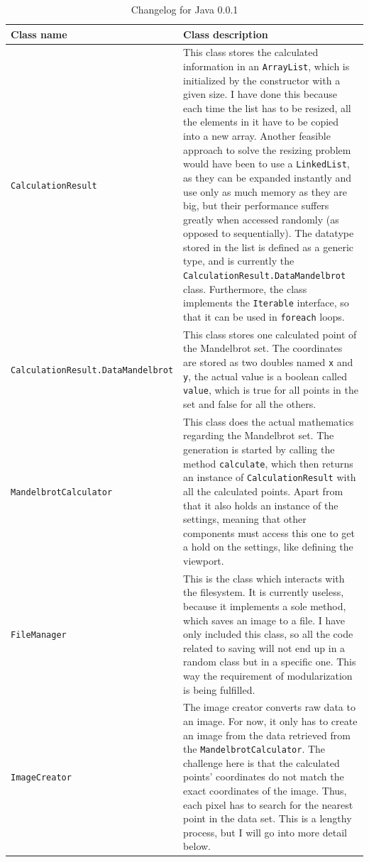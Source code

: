 \documentclass[10pt,a4paper,titlepage]{article}
\begin{document}
	\begin{table}[h!]
		\centering
		\label{tab:java_0_0_1}
		\caption{Changelog for Java 0.0.1}
		\begin{tabular}{p{}|p{}}
			Class name & Class description \\ 
			\hline 
			\verb|CalculationResult|&  This class stores the calculated information in an \verb|ArrayList|, which is initialized by the constructor with a given size. I have done this because each time the list has to be resized, all the elements in it have to be copied into a new array. Another feasible approach to solve the resizing problem would have been to use a \verb|LinkedList|, as they can be expanded instantly and use only as much memory as they are big, but their performance suffers greatly when accessed randomly (as opposed to sequentially). \newline
			The datatype stored in the list is defined as a generic type, and is currently the \verb|CalculationResult.DataMandelbrot| class. Furthermore, the class implements the \verb|Iterable| interface, so that it can be used in \verb|foreach| loops. \\
			\hline 
			\verb|CalculationResult.|\linebreak \hspace*{50 pt}\verb|DataMandelbrot|& This class stores one calculated point of the Mandelbrot set. The coordinates are stored as two doubles named \verb|x| and \verb|y|, the actual value is a boolean called \verb|value|, which is true for all points in the set and false for all the others.\\ 
			\hline 
			\verb|MandelbrotCalculator|& This class does the actual mathematics regarding the Mandelbrot set. The generation is started by calling the method \verb|calculate|, which then returns an instance of \verb|CalculationResult| with all the calculated points.
			Apart from that it also holds an instance of the settings, meaning that other components must access this one to get a hold on the settings, like defining the viewport. \\ 
			\hline
			\verb|FileManager|& This is the class which interacts with the filesystem. It is currently useless, because it implements a sole method, which saves an image to a file. I have only included this class, so all the code related to saving will not end up in a random class but in a specific one. This way the requirement of modularization is being fulfilled. \\ 
			\hline
			\verb|ImageCreator|& The image creator converts raw data to an image. For now, it only has to create an image from the data retrieved from the \verb|MandelbrotCalculator|. The challenge here is that the calculated points' coordinates do not match the exact coordinates of the image. Thus, each pixel has to search for the nearest point in the data set. This is a lengthy process, but I will go into more detail below. \\ 

\end{tabular}
\end{table}
\end{document}
